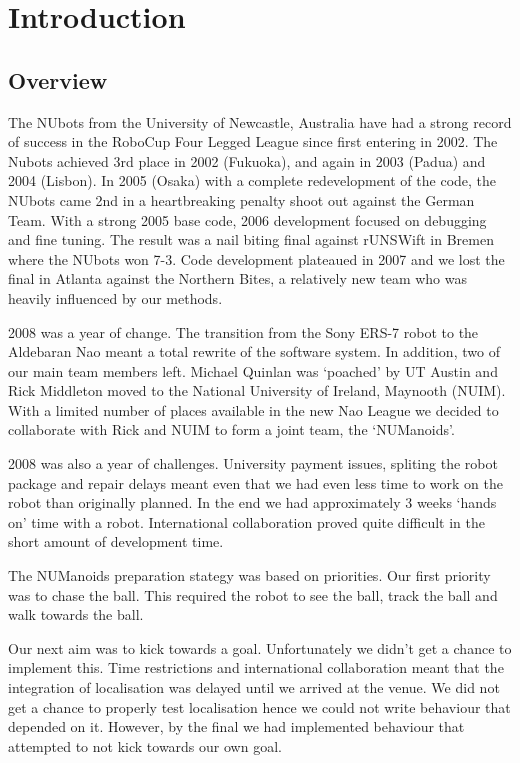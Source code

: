 \section{Introduction}

\subsection{Overview}

The NUbots from the University of Newcastle, Australia have had a strong record of success in the RoboCup Four Legged League since first entering in 2002. The Nubots achieved 3rd place in 2002 (Fukuoka), and again in 2003 (Padua) and 2004 (Lisbon). In 2005 (Osaka) with a complete redevelopment of the code, the NUbots came 2nd in a heartbreaking penalty shoot out against the German Team. With a strong 2005 base code, 2006 development focused on debugging and fine tuning. The result was a nail biting final against rUNSWift in Bremen where the NUbots won 7-3. Code development plateaued in 2007 and we lost the final in Atlanta against the Northern Bites, a relatively new team who was heavily influenced by our methods.  

2008 was a year of change. The transition from the Sony ERS-7 robot to the Aldebaran Nao meant a total rewrite of the software system. In addition, two of our main team members left. Michael Quinlan was `poached' by UT Austin and Rick Middleton moved to the National University of Ireland, Maynooth (NUIM). With a limited number of places available in the new Nao League we decided to collaborate with Rick and NUIM to form a joint team, the `NUManoids'. 

2008 was also a year of challenges. University payment issues, spliting the robot package and repair delays meant even that we had even less time to work on the robot than originally planned. In the end we had approximately 3 weeks `hands on' time with a robot. International collaboration proved quite difficult in the short amount of development time. 

The NUManoids preparation stategy was based on priorities. Our first priority was to chase the ball. This required the robot to see the ball, track the ball and walk towards the ball. 

Our next aim was to kick towards a goal. Unfortunately we didn't get a chance to implement this. Time restrictions and international collaboration meant that the integration of localisation was delayed until we arrived at the venue. We did not get a chance to properly test localisation hence we could not write behaviour that depended on it. However, by the final we had implemented behaviour that attempted to not kick towards our own goal. 

